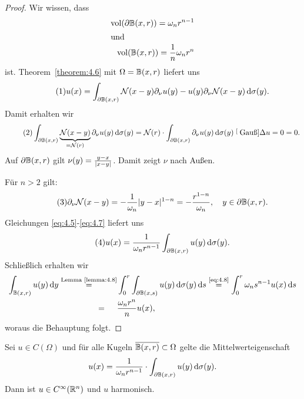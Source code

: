 \begin{proof}
  Wir wissen, dass
  \begin{align*}
    \operatorname{vol}(\partial\mathbb{B}(x,r))=\omega_nr^{n-1}\\
    \intertext{und}
    \operatorname{vol}(\mathbb{B}(x,r))=\frac1n\omega_nr^n
  \end{align*}
  ist. Theorem~\ref{theorem:4.6} mit $\Omega=\mathbb{B}(x,r)$ liefert uns
  \[
  \eq{eq:4.5}
  u(x)=\int_{\partial\B(x,r)}\mathcal{N}(x-y)\partial_\nu u(y)-u(y)\partial_\nu\mathcal{N}(x-y)\d\sigma(y).
  \]
  Damit erhalten wir
  \[
  \eq{eq:4.6}
  \int_{\partial\B(x,r)}\underbrace{\mathcal{N}(x-y)}_{=\mathcal{N}(r)}\partial_\nu u(y)\d\sigma(y)
  =\mathcal{N}(r)\cdot\int_{\partial\B(x,r)}\partial_\nu u(y)\d\sigma(y)
  \stackrel[\scriptsize\text{Gauß}]{\Delta u=0}=0.
  \]
  Auf $\partial\mathbb{B}(x,r)$ gilt $\nu(y)=\frac{y-x}{\lvert x-y\rvert}$. Damit zeigt $\nu$ nach Außen.

  Für $n>2$ gilt:
  \[
  \eq{eq:4.7}
  \partial_\nu\mathcal{N}(x-y)=-\frac 1{\omega_n}\abs{y-x}^{1-n}=-\frac{r^{1-n}}{\omega_n},\quad y\in\partial\B(x,r).
  \]
  Gleichungen \eqref{eq:4.5}-\eqref{eq:4.7} liefert uns
  \[
  \eq{eq:4.8}
  u(x)=\frac1{\omega_n r^{n-1}}\int_{\partial\B(x,r)}u(y)\d\sigma(y).
  \]
  Schließlich erhalten wir
  \[
  \begin{split}
    \int_{\mathbb{B}(x,r)}u(y)\,\mathrm{d} y\overset{\scriptsize\text{Lemma~\ref{lemma:4.8}}}=&
    \int_0^r\int_{\partial\mathbb{B}(x,s)}u(y)\,\mathrm{d}\sigma(y)\,\mathrm{d} s
    \overset{\scriptsize\eqref{eq:4.8}}=
    \int_0^r\omega_ns^{n-1}u(x)\,\mathrm{d} s \\
    =\quad\,\, \, &\frac{\omega_nr^n}n u(x),
  \end{split}
  \]
  woraus die Behauptung folgt.
\end{proof}

\begin{satz}
  \label{satz:4.10}
  Sei $u\in C(\Omega)$ und für alle Kugeln $\overline{\mathbb{B}(x,r)}\subset\Omega$ gelte die Mittelwerteigenschaft
  \[
  u(x)=\frac{1}{\omega_nr^{n-1}}\cdot\int_{\partial\mathbb{B}(x,r)}u(y)\,\mathrm{d}\sigma(y).
  \]
  Dann ist $u\in C^\infty(\mathbb{R}^n)$ und $u$ harmonisch.
\end{satz}

